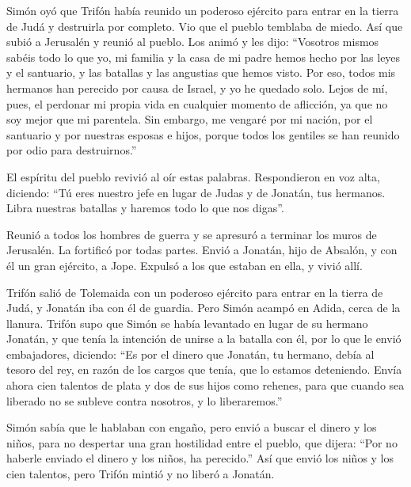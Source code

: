  Simón oyó que Trifón había reunido un poderoso ejército
para entrar en la tierra de Judá y destruirla por completo.
 Vio que el pueblo temblaba de miedo. Así que subió a
Jerusalén y reunió al pueblo.  Los animó y les dijo:
``Vosotros mismos sabéis todo lo que yo, mi familia y la casa de mi
padre hemos hecho por las leyes y el santuario, y las batallas y las
angustias que hemos visto.  Por eso, todos mis hermanos
han perecido por causa de Israel, y yo he quedado solo. 
Lejos de mí, pues, el perdonar mi propia vida en cualquier momento de
aflicción, ya que no soy mejor que mi parentela.  Sin
embargo, me vengaré por mi nación, por el santuario y por nuestras
esposas e hijos, porque todos los gentiles se han reunido por odio para
destruirnos.''

 El espíritu del pueblo revivió al oír estas palabras.
 Respondieron en voz alta, diciendo: ``Tú eres nuestro
jefe en lugar de Judas y de Jonatán, tus hermanos.  Libra
nuestras batallas y haremos todo lo que nos digas''.

 Reunió a todos los hombres de guerra y se apresuró a
terminar los muros de Jerusalén. La fortificó por todas partes.
 Envió a Jonatán, hijo de Absalón, y con él un gran
ejército, a Jope. Expulsó a los que estaban en ella, y vivió allí.

 Trifón salió de Tolemaida con un poderoso ejército para
entrar en la tierra de Judá, y Jonatán iba con él de guardia.
 Pero Simón acampó en Adida, cerca de la llanura.
 Trifón supo que Simón se había levantado en lugar de su
hermano Jonatán, y que tenía la intención de unirse a la batalla con él,
por lo que le envió embajadores, diciendo:  ``Es por el
dinero que Jonatán, tu hermano, debía al tesoro del rey, en razón de los
cargos que tenía, que lo estamos deteniendo.  Envía ahora
cien talentos de plata y dos de sus hijos como rehenes, para que cuando
sea liberado no se subleve contra nosotros, y lo liberaremos.''

 Simón sabía que le hablaban con engaño, pero envió a
buscar el dinero y los niños, para no despertar una gran hostilidad
entre el pueblo,  que dijera: ``Por no haberle enviado el
dinero y los niños, ha perecido.''  Así que envió los
niños y los cien talentos, pero Trifón mintió y no liberó a Jonatán.

